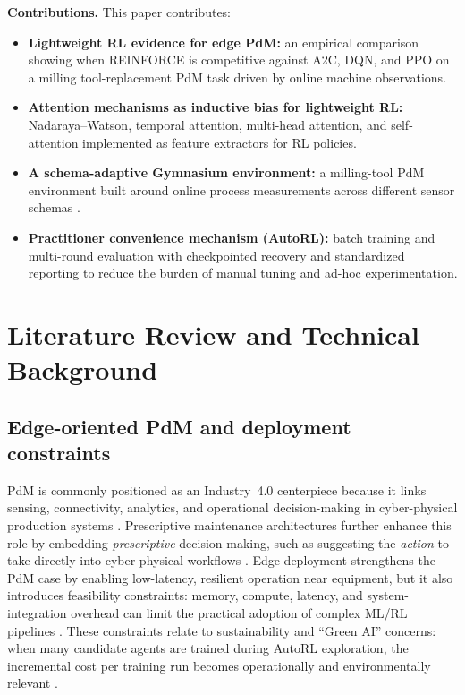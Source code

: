 \documentclass[sn-basic]{sn-jnl} %
\begin{document}
\textbf{Contributions.}
This paper contributes:
\begin{itemize}
		\item \textbf{Lightweight RL evidence for edge PdM:} an empirical comparison showing when \textsc{REINFORCE} is competitive against \textsc{A2C}, \textsc{DQN}, and \textsc{PPO} on a milling tool-replacement PdM task driven by online machine observations.
		\item \textbf{Attention mechanisms as inductive bias for lightweight RL:} Nadaraya--Watson, temporal attention, multi-head attention, and self-attention implemented as feature extractors for RL policies.
		\item \textbf{A schema-adaptive Gymnasium environment:} a milling-tool PdM environment built around online process measurements across different sensor schemas \cite{Foundation2023}.
		\item \textbf{Practitioner convenience mechanism (AutoRL):} batch training and multi-round evaluation with checkpointed recovery and standardized reporting to reduce the burden of manual tuning and ad-hoc experimentation.
\end{itemize}

\section{Literature Review and Technical Background}
\label{sec:lit_tech}
\subsection{Edge-oriented PdM and deployment constraints}
PdM is commonly positioned as an Industry~4.0 centerpiece because it links sensing, connectivity, analytics, and operational decision-making in cyber-physical production systems \cite{Compare2020, Zonta2020}. Prescriptive maintenance architectures further enhance this role by embedding \emph{prescriptive} decision-making, such as suggesting the \emph{action} to take directly into cyber-physical workflows \cite{Ansari2019}. Edge deployment strengthens the PdM case by enabling low-latency, resilient operation near equipment, but it also introduces feasibility constraints: memory, compute, latency, and system-integration overhead can limit the practical adoption of complex ML/RL pipelines \cite{Njor2024, Pandey2023}. These constraints relate to sustainability and ``Green AI'' concerns: when many candidate agents are trained during AutoRL exploration, the incremental cost per training run becomes operationally and environmentally relevant \cite{Schwartz2020, Strubell2019}.
\end{document}
